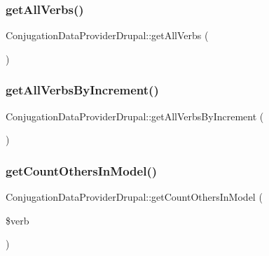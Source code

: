\subsubsection{\texorpdfstring{get\+All\+Verbs()}{getAllVerbs()}}
{\footnotesize\ttfamily Conjugation\+Data\+Provider\+Drupal\+::get\+All\+Verbs (\begin{DoxyParamCaption}{ }\end{DoxyParamCaption})}

\hypertarget{class_conjugation_data_provider_drupal_a28b01db0d2e9a1c72f6eaadaba71de33}{}\label{class_conjugation_data_provider_drupal_a28b01db0d2e9a1c72f6eaadaba71de33} 
\subsubsection{\texorpdfstring{get\+All\+Verbs\+By\+Increment()}{getAllVerbsByIncrement()}}
{\footnotesize\ttfamily Conjugation\+Data\+Provider\+Drupal\+::get\+All\+Verbs\+By\+Increment (\begin{DoxyParamCaption}{ }\end{DoxyParamCaption})}

\hypertarget{class_conjugation_data_provider_drupal_abd938073c7a5088b9a3ecd2e7ca4fb80}{}\label{class_conjugation_data_provider_drupal_abd938073c7a5088b9a3ecd2e7ca4fb80} 
\subsubsection{\texorpdfstring{get\+Count\+Others\+In\+Model()}{getCountOthersInModel()}}
{\footnotesize\ttfamily Conjugation\+Data\+Provider\+Drupal\+::get\+Count\+Others\+In\+Model (\begin{DoxyParamCaption}\item[{}]{\$verb }\end{DoxyParamCaption})}

\hypertarget{class_conjugation_data_provider_drupal_ab22abe0370abb175544efd352f96a468}{}\label{class_conjugation_data_provider_drupal_ab22abe0370abb175544efd352f96a468} 
